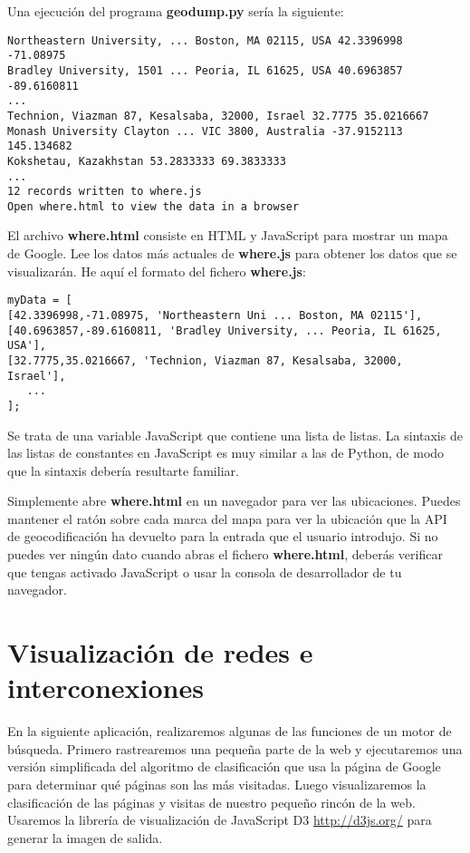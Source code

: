 Una ejecución del programa {\bf geodump.py} sería la siguiente: 

\beforeverb
\begin{verbatim}
Northeastern University, ... Boston, MA 02115, USA 42.3396998 -71.08975
Bradley University, 1501 ... Peoria, IL 61625, USA 40.6963857 -89.6160811
...
Technion, Viazman 87, Kesalsaba, 32000, Israel 32.7775 35.0216667
Monash University Clayton ... VIC 3800, Australia -37.9152113 145.134682
Kokshetau, Kazakhstan 53.2833333 69.3833333
...
12 records written to where.js
Open where.html to view the data in a browser
\end{verbatim}
\afterverb
%
El archivo {\bf where.html} consiste en HTML y JavaScript para mostrar
un mapa de Google. Lee los datos más actuales de {\bf where.js} para obtener
los datos que se visualizarán. He aquí el formato del fichero {\bf where.js}:

\beforeverb
\begin{verbatim}
myData = [
[42.3396998,-71.08975, 'Northeastern Uni ... Boston, MA 02115'],
[40.6963857,-89.6160811, 'Bradley University, ... Peoria, IL 61625, USA'],
[32.7775,35.0216667, 'Technion, Viazman 87, Kesalsaba, 32000, Israel'],
   ...
];
\end{verbatim}
\afterverb
%
Se trata de una variable JavaScript que contiene una lista de listas.
La sintaxis de las listas de constantes en JavaScript es muy similar a
las de Python, de modo que la sintaxis debería resultarte familiar.

Simplemente abre {\bf where.html} en un navegador para ver las ubicaciones.
Puedes mantener el ratón sobre cada marca del mapa para ver la
ubicación que la API de geocodificación ha devuelto para la entrada que el usuario introdujo.
Si no puedes ver ningún dato cuando abras el fichero {\bf where.html}, deberás
verificar que tengas activado JavaScript o usar la consola de desarrollador de tu navegador.

\section{Visualización de redes e interconexiones}

En la siguiente aplicación, realizaremos algunas de las funciones de un motor
de búsqueda. Primero rastrearemos una pequeña parte de la web y ejecutaremos
una versión simplificada del algoritmo de clasificación que usa la página de Google
para determinar qué páginas son las más visitadas. Luego visualizaremos
la clasificación de las páginas y visitas de nuestro pequeño rincón de la web.
Usaremos la librería de visualización de JavaScript D3
\url{http://d3js.org/} para generar la imagen de salida.

